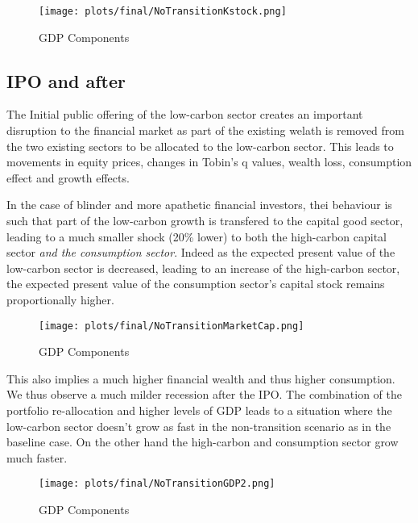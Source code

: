 \documentclass[]{article}
\begin{document}
\begin{figure}[htbp]
\centering
\texttt{[image: plots/final/NoTransitionKstock.png]}
\caption{GDP Components}
\end{figure}

\subsection{IPO and after}\label{ipo-and-after}

The Initial public offering of the low-carbon sector creates an
important disruption to the financial market as part of the existing
welath is removed from the two existing sectors to be allocated to the
low-carbon sector. This leads to movements in equity prices, changes in
Tobin's q values, wealth loss, consumption effect and growth effects.

In the case of blinder and more apathetic financial investors, thei
behaviour is such that part of the low-carbon growth is transfered to
the capital good sector, leading to a much smaller shock (20\% lower) to
both the high-carbon capital sector \emph{and the consumption sector}.
Indeed as the expected present value of the low-carbon sector is
decreased, leading to an increase of the high-carbon sector, the
expected present value of the consumption sector's capital stock remains
proportionally higher.

\begin{figure}[htbp]
\centering
\texttt{[image: plots/final/NoTransitionMarketCap.png]}
\caption{GDP Components}
\end{figure}

This also implies a much higher financial wealth and thus higher
consumption. We thus observe a much milder recession after the IPO. The
combination of the portfolio re-allocation and higher levels of GDP
leads to a situation where the low-carbon sector doesn't grow as fast in
the non-transition scenario as in the baseline case. On the other hand
the high-carbon and consumption sector grow much faster.

\begin{figure}[htbp]
\centering
\texttt{[image: plots/final/NoTransitionGDP2.png]}
\caption{GDP Components}
\end{figure}
\end{document}

